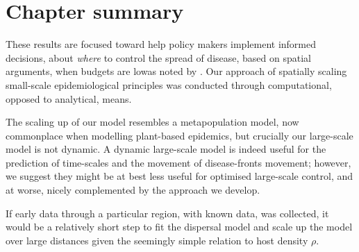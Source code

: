\section{Chapter summary}



These results are focused toward help policy makers implement informed decisions, about \textit{where} to control the spread of disease, based on spatial arguments, when budgets are low\textemdash as noted by \cite{time-varying-infectivity}. Our approach of spatially scaling small-scale epidemiological principles was conducted through computational, opposed to analytical, means. 

The scaling up of our model resembles a metapopulation model, now commonplace when modelling plant-based epidemics, but crucially our large-scale model is not dynamic. A dynamic large-scale model is indeed useful for the prediction of time-scales and the movement of disease-fronts movement; however, we suggest they might be at best less useful for optimised large-scale control, and at worse, nicely complemented by the approach we develop.

If early data through a particular region, with known data, was collected, it would be a relatively short step to fit the dispersal model and scale up the model over large distances given the seemingly simple relation to host density $\rho$.


